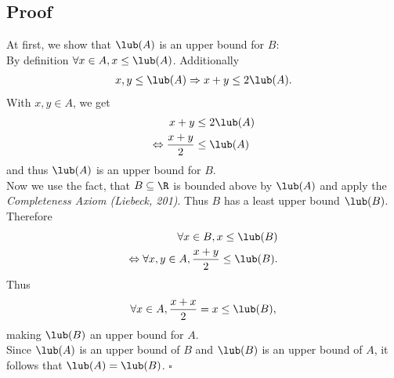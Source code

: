 \documentclass{article}
\begin{document}
\subsection*{Proof}
At first, we show that $\lub(A)$ is an upper bound for $B$:\\
By definition $\forall x \in A, x \leq \lub(A)$. Additionally
\begin{align*}
	x,y\leq \lub(A) \Rightarrow x + y \leq 2\lub(A).
\end{align*}
With $x,y\in A$, we get
\begin{align*}
	x+y                          & \leq 2\lub(A) \\
	\Leftrightarrow\frac{x+y}{2} & \leq \lub(A)
\end{align*}
and thus $\lub(A)$ is an upper bound for $B$.\\
Now we use the fact, that $B\subseteq \R$ is bounded above by $\lub(A)$ and apply the \emph{Completeness Axiom (Liebeck, 201)}. Thus $B$ has a least upper bound $\lub(B)$. Therefore
\begin{align*}
	\forall x \in B, x \leq \lub(B) \\
	\Leftrightarrow \forall x, y \in A, \frac{x+y}{2}\leq \lub(B).
\end{align*}
Thus
\begin{align*}
	\forall x \in A, \frac{x+x}{2}=x \leq \lub(B),
\end{align*}
making $\lub(B)$ an upper bound for $A$.\\
Since $\lub(A)$ is an upper bound of $B$ and $\lub(B)$ is an upper bound of $A$, it follows that $\lub(A)=\lub(B)$. $\square$
\end{document}
